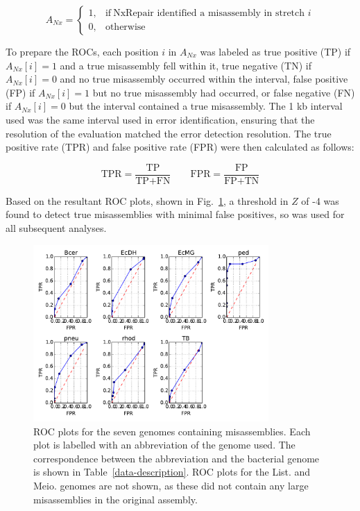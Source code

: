 \begin{equation}
    A_{Nx}=
    \begin{cases}
      1, & \text{if}\ \text{NxRepair identified a misassembly in stretch $i$} \\
      0, & \text{otherwise}
    \end{cases}
  \label{eq:found}
\end{equation}

To prepare the ROCs, each position $i$ in $A_{Nx}$ was labeled as true positive (TP) if $A_{Nx}[i] = 1$ and a true misassembly fell within it, true negative (TN) if $A_{Nx}[i] = 0$ and no true misassembly occurred within the interval, false positive (FP) if $A_{Nx}[i] = 1$ but no true misassembly had occurred, or false negative (FN) if $A_{Nx}[i] = 0$ but the interval contained a true misassembly. The 1 kb interval used was the same interval used in error identification, ensuring that the resolution of the evaluation matched the error detection resolution. The true positive rate (TPR) and false positive rate (FPR) were then calculated as follows:

\begin{equation}
\text{TPR} = \frac{\text{TP}}{\text{TP} + \text{FN}} \qquad \text{FPR} = \frac{\text{FP}}{\text{FP} + \text{TN}}
\label{eq:tpr}
\end{equation}

Based on the resultant ROC plots, shown in Fig.~\ref{fig:ROCs}, a threshold in $Z$ of -4 was found to detect true misassemblies with minimal false positives, so was used for all subsequent analyses. 

\begin{figure}
\centerline{\includegraphics[width=0.8\textwidth]{illumina/allROC.pdf}}
\caption{ROC plots for the seven genomes containing misassemblies. Each plot is labelled with an abbreviation of the genome used. The correspondence between the abbreviation and the bacterial genome is shown in Table~\ref{data-description}. ROC plots for the List. and Meio. genomes are not shown, as these did not contain any large misassemblies in the original assembly. \label{fig:ROCs}}
\end{figure}

